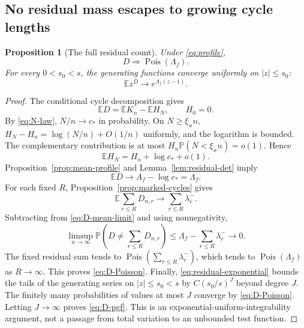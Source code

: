 \documentclass[11pt]{article}
\numberwithin{equation}{section}
\newtheorem{proposition}[theorem]{Proposition}
\theoremstyle{definition}
\theoremstyle{remark}
\newcommand{\E}{\mathbb E}
\newcommand{\Pp}{\mathbb P}
\newcommand{\Pois}{\operatorname{Pois}}
\begin{document}
\subsection{No residual mass escapes to growing cycle lengths}
\begin{proposition}[The full residual count]\label{prop:residual-Poisson}
Under \eqref{eq:profile},
\begin{equation}\label{eq:D-Poisson}
 D\Rightarrow\Pois(\Lambda_f).
\end{equation}
For every $0<s_0<s$, the generating functions converge uniformly on $|z|\le s_0$:
\begin{equation}\label{eq:D-pgf}
 \E z^D\longrightarrow e^{\Lambda_f(z-1)}.
\end{equation}
\end{proposition}
\begin{proof}
The conditional cycle decomposition gives
\begin{equation}\label{eq:D-mean-identity}
 \E D=\E K_n-\E H_N,\qquad H_0=0.
\end{equation}
By \eqref{eq:N-law}, $N/n\to c_*$ in probability. On $N\ge\xi_{\varkappa}n$,
$H_N-H_n=\log(N/n)+O(1/n)$ uniformly, and the logarithm is bounded. The complementary contribution is at most $H_n\Pp(N<\xi_{\varkappa}n)=o(1)$. Hence
\[
 \E H_N=H_n+\log c_*+o(1).
\]
Proposition~\ref{prop:mean-profile} and Lemma~\ref{lem:residual-det} imply
\begin{equation}\label{eq:D-mean-limit}
 \E D\longrightarrow A_f-\log c_*=\Lambda_f.
\end{equation}
For each fixed $R$, Proposition~\ref{prop:marked-cycles} gives
\[
 \E\sum_{r\le R}D_{n,r}\longrightarrow\sum_{r\le R}\lambda_r^-.
\]
Subtracting from \eqref{eq:D-mean-limit} and using nonnegativity,
\[
 \limsup_{n\to\infty}\Pp\left(D\ne\sum_{r\le R}D_{n,r}\right)
 \le\Lambda_f-\sum_{r\le R}\lambda_r^-\longrightarrow0.
\]
The fixed residual sum tends to $\Pois(\sum_{r\le R}\lambda_r^-)$, which tends to $\Pois(\Lambda_f)$ as $R\to\infty$. This proves \eqref{eq:D-Poisson}. Finally, \eqref{eq:residual-exponential} bounds the tails of the generating series on $|z|\le s_0<s$ by $C(s_0/s)^J$ beyond degree $J$. The finitely many probabilities of values at most $J$ converge by \eqref{eq:D-Poisson}. Letting $J\to\infty$ proves \eqref{eq:D-pgf}. This is an exponential-uniform-integrability argument, not a passage from total variation to an unbounded test function.
\end{proof}
\end{document}
